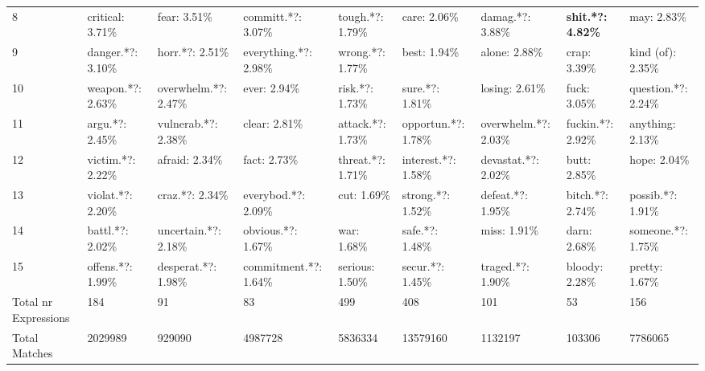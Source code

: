 \begin{table}[h]
\begin{adjustbox}{width=\linewidth, center}
\begin{tabular}{lllllllll}
	8                    &           critical: 3.71\% &          fear: 3.51\% &     committ.*?: 3.07\% &      tough.*?: 1.79\% &         care: 2.06\% &       damag.*?: 3.88\% &  \textbf{shit.*?: 4.82\%} &           may: 2.83\% \\
	9                    &          danger.*?: 3.10\% &       horr.*?: 2.51\% &  everything.*?: 2.98\% &      wrong.*?: 1.77\% &         best: 1.94\% &          alone: 2.88\% &              crap: 3.39\% &     kind (of): 2.35\% \\
	10                   &          weapon.*?: 2.63\% &  overwhelm.*?: 2.47\% &           ever: 2.94\% &       risk.*?: 1.73\% &      sure.*?: 1.81\% &         losing: 2.61\% &              fuck: 3.05\% &   question.*?: 2.24\% \\
	11                   &            argu.*?: 2.45\% &   vulnerab.*?: 2.38\% &          clear: 2.81\% &     attack.*?: 1.73\% &  opportun.*?: 1.78\% &   overwhelm.*?: 2.03\% &         fuckin.*?: 2.92\% &      anything: 2.13\% \\
	12                   &          victim.*?: 2.22\% &        afraid: 2.34\% &           fact: 2.73\% &     threat.*?: 1.71\% &  interest.*?: 1.58\% &    devastat.*?: 2.02\% &              butt: 2.85\% &          hope: 2.04\% \\
	13                   &          violat.*?: 2.20\% &       craz.*?: 2.34\% &    everybod.*?: 2.09\% &           cut: 1.69\% &    strong.*?: 1.52\% &      defeat.*?: 1.95\% &          bitch.*?: 2.74\% &     possib.*?: 1.91\% \\
	14                   &           battl.*?: 2.02\% &  uncertain.*?: 2.18\% &     obvious.*?: 1.67\% &           war: 1.68\% &      safe.*?: 1.48\% &           miss: 1.91\% &              darn: 2.68\% &    someone.*?: 1.75\% \\
	15                   &          offens.*?: 1.99\% &   desperat.*?: 1.98\% &  commitment.*?: 1.64\% &       serious: 1.50\% &     secur.*?: 1.45\% &      traged.*?: 1.90\% &            bloody: 2.28\% &        pretty: 1.67\% \\
	Total nr Expressions &                        184 &                    91 &                     83 &                   499 &                  408 &                    101 &                        53 &                   156 \\
	Total Matches        &                    2029989 &                929090 &                4987728 &               5836334 &             13579160 &                1132197 &                    103306 &               7786065 \\
	\bottomrule
	\end{tabular}
	
\end{adjustbox}
	\end{table}

